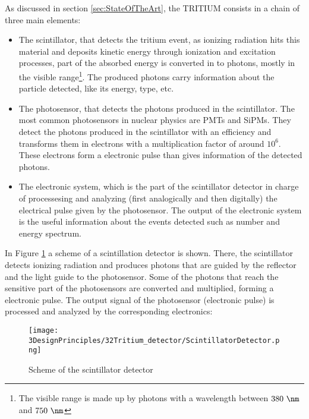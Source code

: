 As discussed in section \ref{sec:StateOfTheArt}, the TRITIUM consists in a chain of three main elements:

\begin{itemize}

\item{} The scintillator, that detects the tritium event, as ionizing radiation hits this material and deposits kinetic energy through ionization and excitation processes, part of the absorbed energy is converted in to photons, mostly in the visible range\footnote{The visible range is made up by photons with a wavelength between $380~\nm$ and $750~\nm$}. The produced photons carry information about the particle detected, like its energy, type, etc.

\item{} The photosensor, that detects the photons produced in the scintillator. The most common photosensors in nuclear physics are PMTs and SiPMs. They detect the photons produced in the scintillator with an efficiency and transforms them in electrons with a multiplication factor of around $10^6$. These electrons form a electronic pulse than gives information of the detected photons.

\item{} The electronic system, which is the part of the scintillator detector in charge of processesing and analyzing (first analogically and then digitally) the electrical pulse given by the photosensor. The output of the electronic system is the useful information about the events detected such as number and energy spectrum.

\end{itemize}

In Figure \ref{fig:ScintillatorDetector} a scheme of a scintillation detector is shown. There, the scintillator detects ionizing radiation and produces photons that are guided by the reflector and the light guide to the photosensor. Some of the photons that reach the sensitive part of the photosensors are converted and multiplied, forming a electronic pulse. The output signal of the photosensor (electronic pulse) is processed and analyzed by the corresponding electronics:

\begin{figure}[hbtp]
\texttt{[image: 3DesignPrinciples/32Tritium\_detector/ScintillatorDetector.png]}
\centering
\caption{Scheme of the scintillator detector\label{fig:ScintillatorDetector}}
\end{figure}
